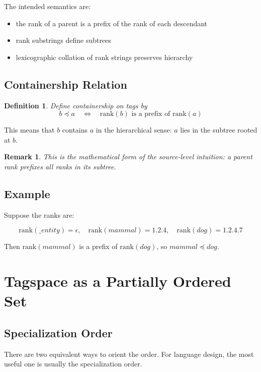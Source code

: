 \documentclass{article}
\newtheorem{definition}{Definition}[section]
\newtheorem{remark}{Remark}[section]
\begin{document}
The intended semantics are:

\begin{itemize}
    \item the rank of a parent is a prefix of the rank of each descendant
    \item rank substrings define subtrees
    \item lexicographic collation of rank strings preserves hierarchy
\end{itemize}

\subsection{Containership Relation}

\begin{definition}
Define containership on tags by
\[
b \preceq a \quad \Longleftrightarrow \quad \mathrm{rank}(b)
\text{ is a prefix of } \mathrm{rank}(a)
\]
\end{definition}

This means that $b$ contains $a$ in the hierarchical sense: $a$ lies in the
subtree rooted at $b$.

\begin{remark}
This is the mathematical form of the source-level intuition:
a parent rank prefixes all ranks in its subtree.
\end{remark}

\subsection{Example}

Suppose the ranks are:

\[
\mathrm{rank}(\_entity)=\epsilon,\quad
\mathrm{rank}(mammal)=1.2.4,\quad
\mathrm{rank}(dog)=1.2.4.7
\]

Then $\mathrm{rank}(mammal)$ is a prefix of $\mathrm{rank}(dog)$, so
$mammal \preceq dog$.

\section{Tagspace as a Partially Ordered Set}

\subsection{Specialization Order}

There are two equivalent ways to orient the order. For language design,
the most useful one is usually the specialization order.
\end{document}
